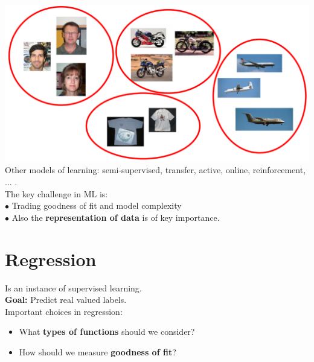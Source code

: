 \documentclass[a4paper, fontsize=8pt, landscape, DIV=1]{scrartcl}
\begin{document}
\begin{multicols*}{4}
		\includegraphics[width=0.85\columnwidth]{images/Introduction/clustering.png}\\
		Other models of learning: semi-supervised, transfer, active, online, reinforcement, ... .\\
		The key challenge in ML is: \\
		$\bullet$ Trading goodness of fit and model complexity\\
		$\bullet$ Also the \textbf{representation of data} is of key importance. 
		
		\section{Regression}
		Is an instance of supervised learning.\\
		\textbf{Goal:} Predict real valued labels.\\
		Important choices in regression:
		\vspace{-0.1cm}
		\begin{itemize}[noitemsep,nolistsep]
			\item What \textbf{types of functions} should we consider?
			\item How should we measure \textbf{goodness of fit}?
		\end{itemize}
		

\end{multicols*}
\end{document}
